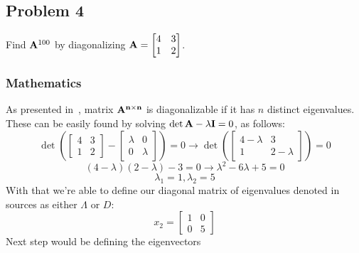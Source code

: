 \subsection{Problem 4}%
\label{sec:problem_4}

Find $\mathbf{A}^{100}$ by diagonalizing $\mathbf{A} = 
\begin{bmatrix}
    4 & 3\\
    1 & 2
\end{bmatrix}$.

\subsubsection*{Mathematics}

As presented in~\cite{Zdunek}, matrix $\mathbf{A^{n\times n}}$ is diagonalizable if it has 
$n$ distinct eigenvalues.
These can be easily found by solving $\det{\mathbf{A} - \lambda\mathbf{I}} = 0$, as follows:
\begin{equation*}
    \det{\left(\begin{bmatrix}
        4 & 3 \\
        1 & 2 
    \end{bmatrix} - 
    \begin{bmatrix}
        \lambda & 0 \\
        0 & \lambda
    \end{bmatrix}\right)} = 0 \rightarrow
    \det{\left(\begin{bmatrix}
        4 - \lambda & 3 \\
        1 & 2 - \lambda
    \end{bmatrix}\right)} = 0
\end{equation*}
\begin{equation*}
    (4 - \lambda)(2 - \lambda) - 3 = 0 \rightarrow
    \lambda^2 - 6\lambda + 5 = 0
\end{equation*}
\begin{equation*}
    \lambda_1 = 1, \lambda_2 = 5 
\end{equation*}
With that we're able to define our diagonal matrix of eigenvalues denoted in sources as either $\Lambda$ or $D$:
\begin{equation*}
    x_2 = 
    \begin{bmatrix}
        1 & 0 \\
        0 & 5
    \end{bmatrix} 
\end{equation*} 
Next step would be defining the eigenvectors
